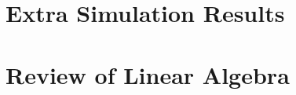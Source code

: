 \documentclass[12pt,draft]{report}
\begin{document}

\appendix

\chapter{Extra Simulation Results}

\chapter{Review of Linear Algebra}
\end{document}
